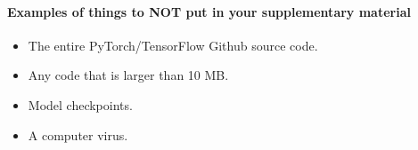 \documentclass[10pt,twocolumn,letterpaper]{article}
\begin{document}
\paragraph{Examples of things to NOT put in your supplementary material}
\begin{itemize}
    \item The entire PyTorch/TensorFlow Github source code.
    \item Any code that is larger than 10 MB.
    \item Model checkpoints.
    \item A computer virus.
\end{itemize}







{\small


}
\end{document}
